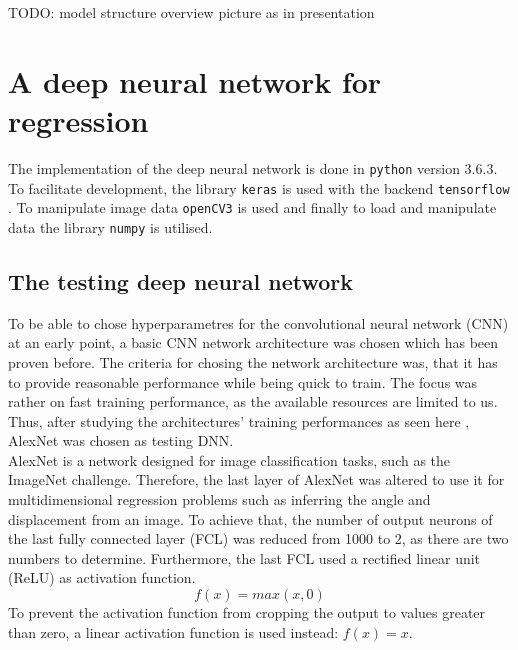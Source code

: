 \documentclass[10pt,a4paper,twoside,journal]{IEEEtran}
\begin{document}
TODO: model structure overview picture as in presentation




\section{A deep neural network for regression}
The implementation of the deep neural network is done in \texttt{python} version 3.6.3. To facilitate development, the library \texttt{keras} \cite{chollet2015keras} is used with the backend \texttt{tensorflow} \cite{tensorflow2015-whitepaper}. To manipulate image data \texttt{openCV3} \cite{opencv_library} is used and finally to load and manipulate data the library \texttt{numpy} \cite{5725236} is utilised. 

\subsection{The testing deep neural network}
\label{ssc:testing-dnn}
To be able to chose hyperparametres for the convolutional neural network (CNN) at an early point, a basic CNN network architecture was chosen which has been proven before. The criteria for chosing the network architecture was, that it has to provide reasonable performance while being quick to train. The focus was rather on fast training performance, as the available resources are limited to us. Thus, after studying the architectures' training performances as seen here \cite{jjohnson-cnn-benchmarks}, AlexNet \cite{alexnet2012imagenet} was chosen as testing DNN.\\

AlexNet is a network designed for image classification tasks, such as the ImageNet challenge. Therefore, the last layer of AlexNet was altered to use it for multidimensional regression problems such as inferring the angle and displacement from an image. To achieve that, the number of output neurons of the last fully connected layer (FCL) was reduced from 1000 to 2, as there are two numbers to determine. Furthermore, the last FCL used a rectified linear unit (ReLU) as activation function. 
\begin{equation}
	f(x) = max(x, 0)
\end{equation}
To prevent the activation function from cropping the output to values greater than zero, a linear activation function is used instead: $ f(x) = x $.
\end{document}

